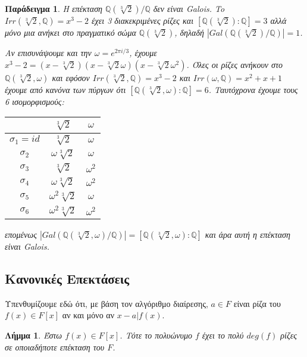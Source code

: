 \documentclass[oneside,a4paper]{article}
\newtheorem{lemma}{Λήμμα}
\newtheorem{example}{Παράδειγμα}
\newcommand {\tl}{\textlatin}
\newcommand{\Q}{\mathbb{Q}}
\begin{document}
\begin{example} Η επέκταση $\Q (\sqrt[3]{2}) / \Q$ δεν είναι \tl{Galois}. To $Irr(\sqrt[3]{2} , \Q ) = x^3 -2$ έχει 3 διακεκριμένες ρίζες και $[\Q (\sqrt[3]{2}) : \Q] = 3$ αλλά μόνο μια ανήκει στο πραγματικό σώμα $\Q (\sqrt[3]{2})$, δηλαδή $|Gal(\Q (\sqrt[3]{2}) / \Q)| = 1$.
	
	Αν επισυνάψουμε και την $\omega = e^{2\pi i /3}$, έχουμε $x^3 - 2 = (x-\sqrt[3]{2})(x-\sqrt[3]{2}\omega ) (x-\sqrt[3]{2} \omega^2)$. Όλες οι ρίζες ανήκουν στο $\Q (\sqrt[3]{2}, \omega)$ και εφόσον $Irr(\sqrt[3]{2}, \Q) = x^3 - 2$ και $Irr(\omega , \Q) = x^2 + x + 1$ έχουμε από κανόνα των πύργων ότι $[\Q (\sqrt[3]{2} , \omega) : \Q] = 6$.
	Ταυτόχρονα έχουμε τους 6 ισομορφισμούς:

	\begin{center}
		\begin{tabular}{|c|c|c |} 
		\hline
		  & $\sqrt[3]{2}$ & $\omega$  \\ 
		\hline
		$\sigma_1=id$ & $\sqrt[3]{2}$ & $\omega$ \\ 
		
		$\sigma_2$ & $\omega\sqrt[3]{2}$ & $\omega$  \\
		
		$\sigma_3$ & $\sqrt[3]{2}$ & $\omega^2$  \\
		
		$\sigma_4$ & $\omega\sqrt[3]{2}$ & $\omega^2$  \\
		
		$\sigma_5$ &$\omega^2\sqrt[3]{2}$ & $\omega$  \\
		
		$\sigma_6$ &$\omega^2\sqrt[3]{2}$ & $\omega^2$ \\
		\hline
	   \end{tabular}
	   \end{center}

	επομένως $|Gal(\Q (\sqrt[3]{2}, \omega)/ \Q )| = [\Q (\sqrt[3]{2} , \omega): \Q]$
	και άρα αυτή η επέκταση είναι \tl{Galois}.
\end{example}

\subsection{Κανονικές Επεκτάσεις}

Υπενθυμίζουμε εδώ ότι, με βάση τον αλγόριθμο διαίρεσης, $a \in F$ είναι ρίζα του $f(x) \in F[x]$ αν και μόνο αν $x-a | f(x)$.

\begin{lemma}
	Έστω $f(x) \in F[x]$. Τότε το πολυώνυμο $f$ έχει το πολύ $deg(f)$ ρίζες σε οποιαδήποτε επέκταση του $F$.
\end{lemma}
\end{document}
